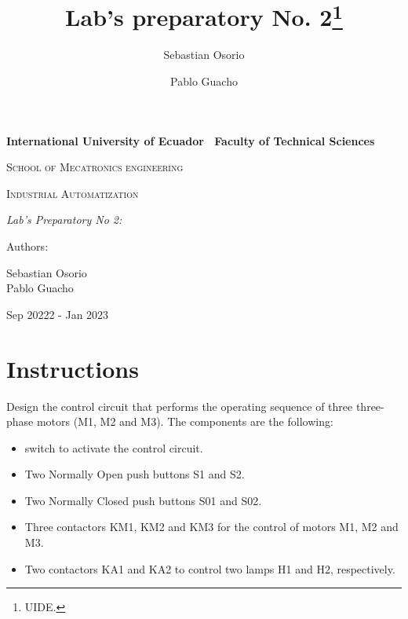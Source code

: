 \documentclass[runningheads]{llncs}
\begin{document}
\begin{titlepage}
    \centering
    {\bfseries\LARGE International University of Ecuador \
        Faculty of Technical Sciences  \par}
    \vspace{1cm}
    {\scshape\Large School of Mecatronics engineering \par}
    \vspace{3cm}
    {\scshape\Huge Industrial Automatization \par}
    \vspace{3cm}
    {\itshape\Large Lab's Preparatory No 2:  \par}
    \vfill
    {\Large Authors: \par}
    {\Large Sebastian Osorio \\ Pablo Guacho \par}
    \vfill
    {\Large Sep 20222 - Jan 2023 \par}
\end{titlepage}
\newpage
\title{Lab's preparatory No. 2\thanks{UIDE.}}
%
\author{Sebastian Osorio \and Pablo Guacho}



\maketitle

\section{Instructions}
Design the control circuit that performs the operating sequence of three three-phase motors (M1, M2 and M3).
The components are the following:
\begin{itemize}
    \item  switch to activate the control circuit.
    \item Two Normally Open push buttons S1 and S2.
    \item  Two Normally Closed push buttons S01 and S02.
    \item  Three contactors KM1, KM2 and KM3 for the control of motors M1, M2 and
          M3.
    \item Two contactors KA1 and KA2 to control two lamps H1 and H2, respectively.
\end{itemize}
\end{document}
